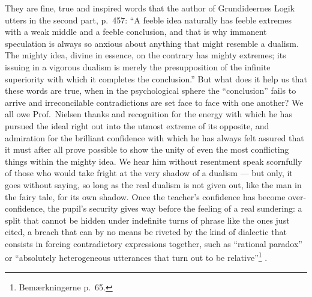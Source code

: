 \documentclass[12pt,a4paper]{book}
\renewcommand{\thefootnote}{*)}
\newcommand{\fnmark}[2]{\renewcommand{\thefootnote}{#1}\footnote{#2}%
  \renewcommand{\thefootnote}{*)}}
\newcommand{\opage}[1]{\marginnote{\footnotesize\textit{[#1]}}}
\begin{document}
They are fine, true and inspired words that the author of Grundideernes Logik
utters in the second part, p.\ 457: ``A feeble idea naturally has feeble
extremes with a weak middle and a feeble conclusion, and that is why immanent
speculation is always so anxious about anything that might resemble a dualism.
The mighty idea, divine in
\opage{61}essence, on the contrary has mighty extremes; its issuing in a
vigorous dualism is merely the presupposition of the infinite superiority with
which it completes the conclusion.'' But what does it help us that these words
are true, when in the psychological sphere the ``conclusion'' fails to arrive
and irreconcilable contradictions are set face to face with one another? We all
owe Prof.\ Nielsen thanks and recognition for the energy with which he has
pursued the ideal right out into the utmost extreme of its opposite, and
admiration for the brilliant confidence with which he has always felt assured
that it must after all prove possible to show the unity of even the most
conflicting things within the mighty idea. We hear him without resentment speak
scornfully of those who would take fright at the very shadow of a dualism ---
but only, it goes without saying, so long as the real dualism is not given out,
like the man in the fairy tale, for its own shadow. Once the teacher's
confidence has become over-confidence, the pupil's security gives way before
the feeling of a real sundering: a split that cannot be hidden under indefinite
turns of phrase like the ones just cited, a breach that can by no means be
riveted by the kind of dialectic that consists in forcing contradictory
expressions together, such as ``rational paradox'' or ``absolutely
heterogeneous utterances that turn out to be
relative''\fnmark{*)}{Bemærkningerne p.\ 65.}.
\end{document}
